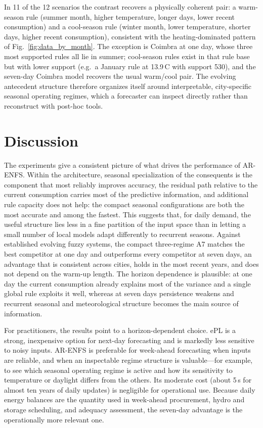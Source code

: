\documentclass[preprint,12pt]{elsarticle}
\begin{document}
In 11 of the 12 scenarios the contrast recovers a physically coherent pair: a warm-season rule (summer month, higher temperature, longer days, lower recent consumption) and a cool-season rule (winter month, lower temperature, shorter days, higher recent consumption), consistent with the heating-dominated pattern of Fig.~\ref{fig:data_by_month}. The exception is Coimbra at one day, whose three most supported rules all lie in summer; cool-season rules exist in that rule base but with lower support (e.g.\ a January rule at 13.9\,\textdegree C with support 530), and the seven-day Coimbra model recovers the usual warm/cool pair. The evolving antecedent structure therefore organizes itself around interpretable, city-specific seasonal operating regimes, which a forecaster can inspect directly rather than reconstruct with post-hoc tools.

\section{Discussion}
\label{subsec:cross_experiment_discussion}

The experiments give a consistent picture of what drives the performance of AR-ENFS. Within the architecture, seasonal specialization of the consequents is the component that most reliably improves accuracy, the residual path relative to the current consumption carries most of the predictive information, and additional rule capacity does not help: the compact seasonal configurations are both the most accurate and among the fastest. This suggests that, for daily demand, the useful structure lies less in a fine partition of the input space than in letting a small number of local models adapt differently to recurrent seasons. Against established evolving fuzzy systems, the compact three-regime A7 matches the best competitor at one day and outperforms every competitor at seven days, an advantage that is consistent across cities, holds in the most recent years, and does not depend on the warm-up length. The horizon dependence is plausible: at one day the current consumption already explains most of the variance and a single global rule exploits it well, whereas at seven days persistence weakens and recurrent seasonal and meteorological structure becomes the main source of information.

For practitioners, the results point to a horizon-dependent choice. ePL is a strong, inexpensive option for next-day forecasting and is markedly less sensitive to noisy inputs. AR-ENFS is preferable for week-ahead forecasting when inputs are reliable, and when an inspectable regime structure is valuable---for example, to see which seasonal operating regime is active and how its sensitivity to temperature or daylight differs from the others. Its moderate cost (about 5\,s for almost ten years of daily updates) is negligible for operational use. Because daily energy balances are the quantity used in week-ahead procurement, hydro and storage scheduling, and adequacy assessment, the seven-day advantage is the operationally more relevant one.
\end{document}
